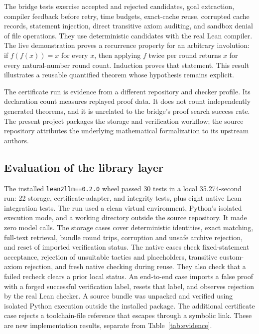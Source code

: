 \documentclass[10pt,a4paper]{article}
\newcommand{\code}[1]{\texttt{#1}}
\begin{document}
The bridge tests exercise accepted and rejected candidates, goal extraction,
compiler feedback before retry, time budgets, exact-cache reuse, corrupted
cache records, statement injection, direct transitive axiom auditing, and
sandbox denial of file operations. They use deterministic candidates with the
real Lean compiler. The live demonstration proves a recurrence property for an
arbitrary involution: if $f(f(x))=x$ for every $x$, then applying $f$ twice per
round returns $x$ for every natural-number round count. Induction proves that
statement. This result illustrates a reusable quantified theorem whose
hypothesis remains explicit.

The certificate run is evidence from a different repository and checker
profile. Its declaration count measures replayed proof data. It does not count
independently generated theorems, and it is unrelated to the bridge's proof
search success rate. The present project packages the storage and verification
workflow; the source repository attributes the underlying mathematical
formalization to its upstream authors.

\subsection{Evaluation of the library layer}
The installed \code{lean2llm==0.2.0} wheel passed 30 tests in a local
35.274-second run: 22 storage, certificate-adapter, and integrity tests, plus
eight native Lean integration tests. The run used a clean virtual environment,
Python's isolated execution mode, and a working directory outside the source
repository. It made zero model calls. The storage cases cover
deterministic identities, exact matching, full-text retrieval, bundle round
trips, corruption and unsafe archive rejection, and reset of imported
verification status. The native cases check fixed-statement acceptance,
rejection of unsuitable tactics and placeholders, transitive custom-axiom
rejection, and fresh native checking during reuse. They also check that a failed
recheck clears a prior local status. An end-to-end case imports a false proof
with a forged successful verification label, resets that label, and observes
rejection by the real Lean checker. A source bundle was unpacked and verified
using isolated Python execution outside the installed package. The additional
certificate case rejects a toolchain-file reference that escapes through a
symbolic link. These are new implementation results, separate from
Table~\ref{tab:evidence}.
\end{document}
